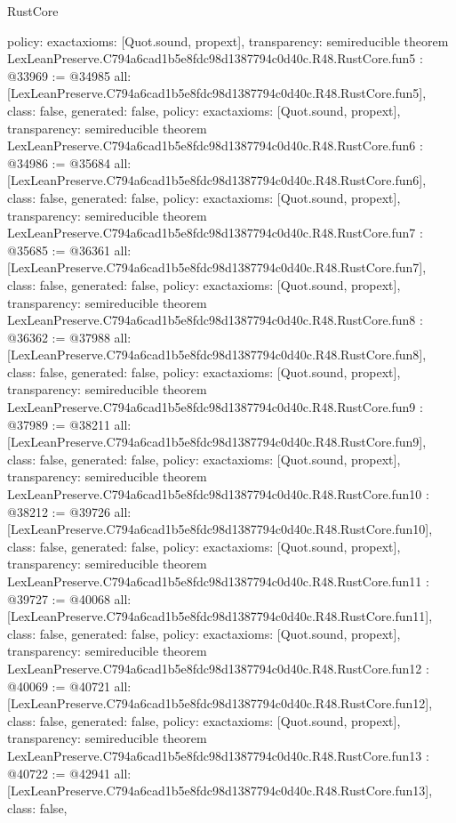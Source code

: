 \begin{lexlean}{RustCore}
\begin{coremodule}
{  policy: exact{axioms: [Quot.sound, propext]},
  transparency: semireducible
}
theorem LexLeanPreserve.C794a6cad1b5e8fdc98d1387794c0d40c.R48.RustCore.fun5 : @33969 := @34985 {
  all: [LexLeanPreserve.C794a6cad1b5e8fdc98d1387794c0d40c.R48.RustCore.fun5],
  class: false,
  generated: false,
  policy: exact{axioms: [Quot.sound, propext]},
  transparency: semireducible
}
theorem LexLeanPreserve.C794a6cad1b5e8fdc98d1387794c0d40c.R48.RustCore.fun6 : @34986 := @35684 {
  all: [LexLeanPreserve.C794a6cad1b5e8fdc98d1387794c0d40c.R48.RustCore.fun6],
  class: false,
  generated: false,
  policy: exact{axioms: [Quot.sound, propext]},
  transparency: semireducible
}
theorem LexLeanPreserve.C794a6cad1b5e8fdc98d1387794c0d40c.R48.RustCore.fun7 : @35685 := @36361 {
  all: [LexLeanPreserve.C794a6cad1b5e8fdc98d1387794c0d40c.R48.RustCore.fun7],
  class: false,
  generated: false,
  policy: exact{axioms: [Quot.sound, propext]},
  transparency: semireducible
}
theorem LexLeanPreserve.C794a6cad1b5e8fdc98d1387794c0d40c.R48.RustCore.fun8 : @36362 := @37988 {
  all: [LexLeanPreserve.C794a6cad1b5e8fdc98d1387794c0d40c.R48.RustCore.fun8],
  class: false,
  generated: false,
  policy: exact{axioms: [Quot.sound, propext]},
  transparency: semireducible
}
theorem LexLeanPreserve.C794a6cad1b5e8fdc98d1387794c0d40c.R48.RustCore.fun9 : @37989 := @38211 {
  all: [LexLeanPreserve.C794a6cad1b5e8fdc98d1387794c0d40c.R48.RustCore.fun9],
  class: false,
  generated: false,
  policy: exact{axioms: [Quot.sound, propext]},
  transparency: semireducible
}
theorem LexLeanPreserve.C794a6cad1b5e8fdc98d1387794c0d40c.R48.RustCore.fun10 : @38212 := @39726 {
  all: [LexLeanPreserve.C794a6cad1b5e8fdc98d1387794c0d40c.R48.RustCore.fun10],
  class: false,
  generated: false,
  policy: exact{axioms: [Quot.sound, propext]},
  transparency: semireducible
}
theorem LexLeanPreserve.C794a6cad1b5e8fdc98d1387794c0d40c.R48.RustCore.fun11 : @39727 := @40068 {
  all: [LexLeanPreserve.C794a6cad1b5e8fdc98d1387794c0d40c.R48.RustCore.fun11],
  class: false,
  generated: false,
  policy: exact{axioms: [Quot.sound, propext]},
  transparency: semireducible
}
theorem LexLeanPreserve.C794a6cad1b5e8fdc98d1387794c0d40c.R48.RustCore.fun12 : @40069 := @40721 {
  all: [LexLeanPreserve.C794a6cad1b5e8fdc98d1387794c0d40c.R48.RustCore.fun12],
  class: false,
  generated: false,
  policy: exact{axioms: [Quot.sound, propext]},
  transparency: semireducible
}
theorem LexLeanPreserve.C794a6cad1b5e8fdc98d1387794c0d40c.R48.RustCore.fun13 : @40722 := @42941 {
  all: [LexLeanPreserve.C794a6cad1b5e8fdc98d1387794c0d40c.R48.RustCore.fun13],
  class: false,
}
\end{coremodule}
\end{lexlean}
